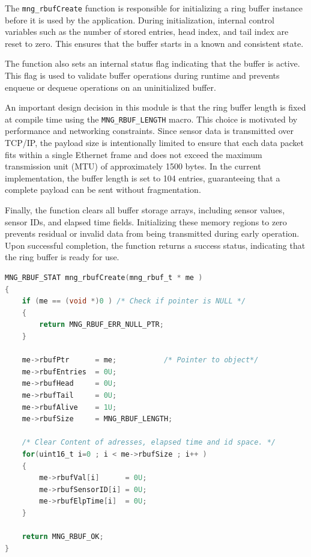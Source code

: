 The \texttt{mng\_rbufCreate} function is responsible for initializing a ring buffer 
instance before it is used by the application. During initialization, internal control 
variables such as the number of stored entries, head index, and tail index are reset to 
zero. This ensures that the buffer starts in a known and consistent state.

The function also sets an internal status flag indicating that the buffer is active. 
This flag is used to validate buffer operations during runtime and prevents enqueue or 
dequeue operations on an uninitialized buffer.

An important design decision in this module is that the ring buffer length is fixed at 
compile time using the \texttt{MNG\_RBUF\_LENGTH} macro. This choice is motivated by 
performance and networking constraints. Since sensor data is transmitted over TCP/IP, 
the payload size is intentionally limited to ensure that each data packet fits within a 
single Ethernet frame and does not exceed the maximum transmission unit (MTU) of 
approximately 1500 bytes. In the current implementation, the buffer length is set to 
104 entries, guaranteeing that a complete payload can be sent without fragmentation.

Finally, the function clears all buffer storage arrays, including sensor values, sensor 
IDs, and elapsed time fields. Initializing these memory regions to zero prevents 
residual or invalid data from being transmitted during early operation. Upon successful 
completion, the function returns a success status, indicating that the ring buffer is 
ready for use.

\begin{lstlisting}[language=C,
caption={Ring Buffer Create API},
label={lst:mng_rbufCreate_api}]
MNG_RBUF_STAT mng_rbufCreate(mng_rbuf_t * me )
{
    if (me == (void *)0 ) /* Check if pointer is NULL */
    {
        return MNG_RBUF_ERR_NULL_PTR;
    }

    me->rbufPtr      = me;           /* Pointer to object*/
    me->rbufEntries  = 0U;
    me->rbufHead     = 0U;
    me->rbufTail     = 0U;
    me->rbufAlive    = 1U;
    me->rbufSize     = MNG_RBUF_LENGTH;

    /* Clear Content of adresses, elapsed time and id space. */
    for(uint16_t i=0 ; i < me->rbufSize ; i++ )
    {
        me->rbufVal[i]      = 0U;
        me->rbufSensorID[i] = 0U;
        me->rbufElpTime[i]  = 0U;
    }

    return MNG_RBUF_OK;
}
\end{lstlisting}

